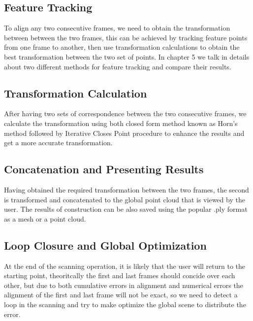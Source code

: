 \subsection{Feature Tracking}
   To align any two consecutive frames, we need to obtain the transformation between between the two frames, this can be achieved by tracking feature points from one frame to another, then use transformation calculations to obtain the best transformation between the two set of points.
   In chapter 5 we talk in details about two different methods for feature tracking and compare their results.

\subsection{Transformation Calculation}
   After having two sets of correspondence between the two consecutive frames, we calculate the transformation using both closed form method known as Horn's method followed by Iterative Closes Point procedure to enhance the results and get a more accurate transformation.

\subsection{Concatenation and Presenting Results}
   Having obtained the required transformation between the two frames, the second is transformed and concatenated to the global point cloud that is viewed by the user.
   The results of construction can be also saved using the popular .ply format as a mesh or a point cloud.

\subsection{Loop Closure and Global Optimization}
   At the end of the scanning operation, it is likely that the user will return to the starting point, theoritcally the first and last frames should concide over each other, but due to both cumulative errors in alignment and numerical errors the alignment of the first and last frame will not be exact, so we need to detect a loop in the scanning and try to make optimize the global scene to distribute the error.
\pagebreak

